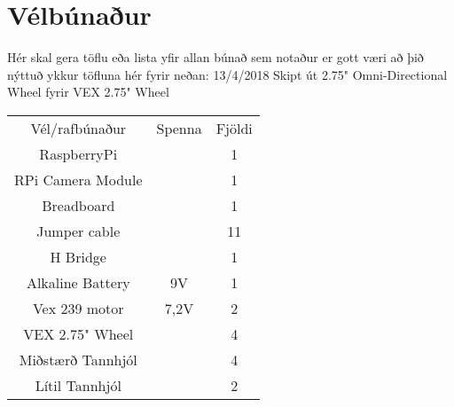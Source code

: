 \section{Vélbúnaður}
Hér skal gera töflu eða lista yfir allan búnað sem notaður er gott væri að þið nýttuð ykkur töfluna hér fyrir neðan:
13/4/2018 Skipt út  2.75" Omni-Directional Wheel fyrir VEX 2.75" Wheel

\begin{center}
\begin{tabular}{ |c|c|c| } 
 \hline
 Vél/rafbúnaður &Spenna &Fjöldi\\ 
 RaspberryPi & & 1 \\ 
 RPi Camera Module & & 1 \\
 Breadboard & & 1 \\
 Jumper cable & & 11 \\
 H Bridge & & 1 \\
 Alkaline Battery & 9V & 1 \\
 Vex 239 motor & 7,2V & 2 \\
 VEX 2.75" Wheel & & 4 \\
 Miðstærð Tannhjól & & 4 \\
 Lítil Tannhjól & & 2 \\
 \hline
\end{tabular}
\end{center}